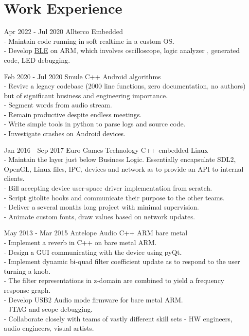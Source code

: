 \documentclass{tccv}
\begin{document}
\pagebreak
\section{Work Experience}
\begin{eventlist}
\item{Apr 2022 - Jul 2020}
     {Allterco}
     {Embedded}  \\
- Maintain code running in soft realtime in a custom OS.  \\
- Develop
{\href{https://en.wikipedia.org/wiki/Bluetooth_Low_Energy}{BLE}}
on ARM, which involves oscilloscope, logic analyzer , generated code, LED debugging.  \\

\item{Feb 2020 - Jul 2020}
     {Smule}
     {C++ Android algorithms}  \\
- Revive a legacy codebase (2000 line functions, zero documentation, no authors) but of significant business and engineering importance.  \\
- Segment words from audio stream.  \\
- Remain productive despite endless meetings.  \\
- Write simple tools in python to parse logs and source code.  \\
- Investigate crashes on Android devices.  \\

\item{Jan 2016 - Sep 2017}
     {Euro Games Technology}
     {C++ embedded Linux}  \\
- Maintain the layer just below Business Logic.
  Essentially encapsulate SDL2, OpenGL, Linux files, IPC, devices and network as to provide an API to internal clients.  \\
- Bill accepting device user-space driver implementation from scratch.  \\
- Script gitolite hooks and communicate their purpose to the other teams.  \\
- Deliver a several months long project with minimal supervision.  \\
- Animate custom fonts, draw values based on network updates.  \\

\item{May 2013 - Mar 2015}
     {Antelope Audio}
     {C++ ARM bare metal}  \\
- Implement a reverb in C++ on bare metal ARM.  \\
- Design a GUI communicating with the device using pyQt.  \\
- Implement dynamic bi-quad filter coefficient update as to respond to the user turning a knob.  \\
- The filter representations in z-domain are combined to yield a frequency response graph.  \\
- Develop USB2 Audio mode firmware for bare metal ARM.  \\
- JTAG-and-scope debugging.  \\
- Collaborate closely with teams of vastly different skill sets - HW engineers, audio engineers, visual artists.  \\


\end{eventlist}
\end{document}

